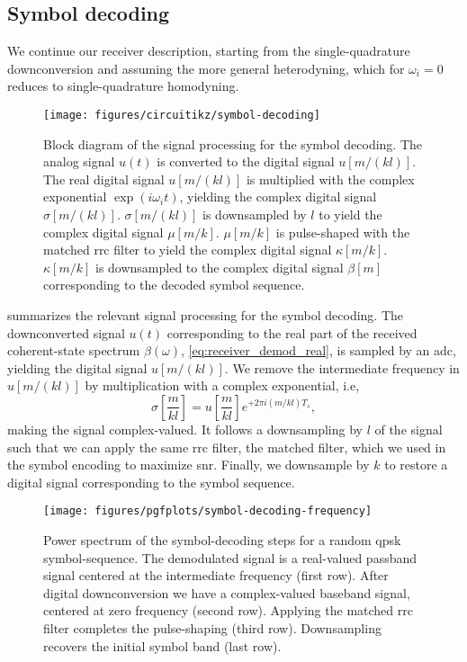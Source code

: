 \FloatBarrier
\subsection{Symbol decoding}

We continue our receiver description, starting from the single-quadrature downconversion and assuming the more general heterodyning, which for $\omega_i=0$ reduces to single-quadrature homodyning.
\begin{figure}[htb]
	\centering
	\texttt{[image: figures/circuitikz/symbol-decoding]}
	\caption{Block diagram of the signal processing for the symbol decoding. The analog signal $u(t)$ is converted to the digital signal $u[m/(kl)]$. The real digital signal $u[m/(kl)]$ is multiplied with the complex exponential $\exp(i\omega_it)$, yielding the complex digital signal $\sigma[m/(kl)]$. $\sigma[m/(kl)]$ is downsampled by $l$ to yield the complex digital signal $\mu[m/k]$. $\mu[m/k]$ is pulse-shaped with the matched \gls{rrc} filter to yield the complex digital signal $\kappa[m/k]$. $\kappa[m/k]$ is downsampled to the complex digital signal $\beta[m]$ corresponding to the decoded symbol sequence.}\label{fig:symbol_decoding_blocks}
\end{figure}
 summarizes the relevant signal processing for the symbol decoding.
The downconverted signal $u(t)$ corresponding to the real part of the received coherent-state spectrum $\beta(\omega)$, \cref{eq:receiver_demod_real}, is sampled by an \gls{adc}, yielding the digital signal $u[m/(kl)]$.
We remove the intermediate frequency in $u[m/(kl)]$ by multiplication with a complex exponential, i.e,
\begin{equation}
	\sigma\left[\frac{m}{kl}\right]
	=
	u\left[\frac{m}{kl}\right]
	e^{+2\pi i (m/kl) T_s}
	,
\end{equation}
making the signal complex-valued.
It follows a downsampling by $l$ of the signal such that we can apply the same \gls{rrc} filter, the matched filter, which we used in the symbol encoding to maximize \gls{snr}.
Finally, we downsample by $k$ to restore a digital signal corresponding to the symbol sequence.
\begin{figure}[htb]
	\centering
	\texttt{[image: figures/pgfplots/symbol-decoding-frequency]}
	\caption{Power spectrum of the symbol-decoding steps for a random \gls{qpsk} symbol-sequence. The demodulated signal is a real-valued passband signal centered at the intermediate frequency (first row). After digital downconversion we have a complex-valued baseband signal, centered at zero frequency (second row). Applying the matched \gls{rrc} filter completes the pulse-shaping (third row). Downsampling recovers the initial symbol band (last row).}\label{fig:symbol_decoding_frequency}
\end{figure}
